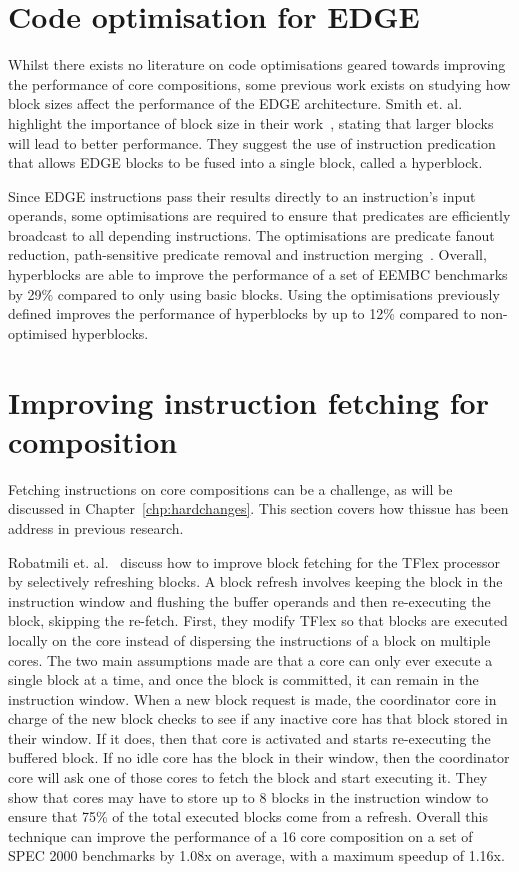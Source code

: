 \section{Code optimisation for EDGE}

Whilst there exists no literature on code optimisations geared towards improving the performance of core compositions, some previous work exists on studying how block sizes affect the performance of the EDGE architecture.
Smith et. al. highlight the importance of block size in their work~\cite{smith2006edge}, stating that larger blocks will lead to better performance.
They suggest the use of instruction predication~\cite{smith2006dataflowpred} that allows EDGE blocks to be fused into a single block, called a hyperblock.

Since EDGE instructions pass their results directly to an instruction's input operands, some optimisations are required to ensure that predicates are efficiently broadcast to all depending instructions.
The optimisations are predicate fanout reduction, path-sensitive predicate removal and instruction merging~\cite{smith2006dataflowpred}.
Overall, hyperblocks are able to improve the performance of a set of EEMBC benchmarks by 29\% compared to only using basic blocks.
Using the optimisations previously defined improves the performance of hyperblocks by up to 12\% compared to non-optimised hyperblocks.
\vspace{-1em}
\section{Improving instruction fetching for composition}
Fetching instructions on core compositions can be a challenge, as will be discussed in Chapter~\ref{chp:hardchanges}.
This section covers how thissue has been address in previous research.

Robatmili et. al.~\cite{robatmili2011uniproc} discuss how to improve block fetching for the TFlex processor by selectively refreshing blocks.
A block refresh involves keeping the block in the instruction window and flushing the buffer operands and then re-executing the block, skipping the re-fetch.
First, they modify TFlex so that blocks are executed locally on the core instead of dispersing the instructions of a block on multiple cores.
The two main assumptions made are that a core can only ever execute a single block at a time, and once the block is committed, it can remain in the instruction window.
When a new block request is made, the coordinator core in charge of the new block checks to see if any inactive core has that block stored in their window.
If it does, then that core is activated and starts re-executing the buffered block.
If no idle core has the block in their window, then the coordinator core will ask one of those cores to fetch the block and start executing it.
They show that cores may have to store up to 8 blocks in the instruction window to ensure that 75\% of the total executed blocks come from a refresh.
Overall this technique can improve the performance of a 16 core composition on a set of SPEC 2000 benchmarks by 1.08x on average, with a maximum speedup of 1.16x.

